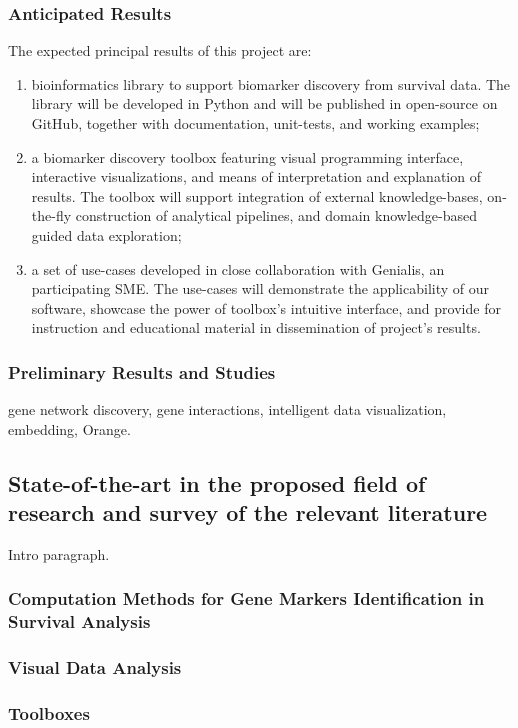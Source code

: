 \documentclass[11pt,a4paper]{article}
\begin{document}
\subsubsection*{Anticipated Results}
The expected principal results of this project are:
\begin{enumerate}
	\item bioinformatics library to support biomarker discovery from survival data. The library will be developed in Python and will be published in open-source on GitHub, together with documentation, unit-tests, and working examples;
	\item a biomarker discovery toolbox featuring visual programming interface, interactive visualizations, and means of interpretation and explanation of results. The toolbox will support integration of external knowledge-bases, on-the-fly construction of analytical pipelines, and domain knowledge-based guided data exploration;
	\item a set of use-cases developed in close collaboration with Genialis, an participating SME. The use-cases will demonstrate the applicability of our software, showcase the power of toolbox's intuitive interface, and provide for instruction and educational material in dissemination of project's results.
\end{enumerate}

\subsubsection*{Preliminary Results and Studies}

gene network discovery, gene interactions, intelligent data visualization, embedding, Orange.

\subsection{State-of-the-art in the proposed field of research and survey of the relevant literature}

Intro paragraph.

\subsubsection*{Computation Methods for Gene Markers Identification in Survival Analysis}
\subsubsection*{Visual Data Analysis}
\subsubsection*{Toolboxes}
\end{document}
